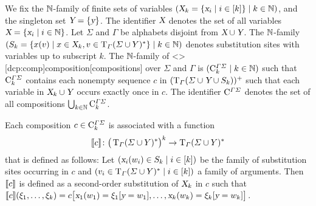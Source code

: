 \documentclass[../../document.tex]{subfiles}
\begin{document}
    \begin{definition}[Composition]
        We fix the \(\mathbb{N}\)-family of finite sets of variables \((\textsl{X}_k = \{\textsl{x}_i \mid i \in [k]\} \mid k \in \mathbb{N})\), and the singleton set \(\textsl{Y} = \{\textsl{y}\}\).
        The identifier \(\textsl{X}\) denotes the set of all variables \(\textsl{X} = \{\textsl{x}_i \mid i \in \mathbb{N}\}\).
        Let \(\varSigma\) and \(\varGamma\) be alphabets disjoint from \(\textsl{X} \cup \textsl{Y}\).
        The \(\mathbb{N}\)-family \((S_k = \{x(v) \mid x \in \textsl{X}_k, v \in \operatorname{T}_\varGamma(\varSigma \cup Y)^*\} \mid k \in \mathbb{N})\) denotes substitution sites with variables up to subscript \(k\).
        The \(\mathbb{N}\)-family of  <\dcp>[dcp:comp]{composition}[compositions] over \(\varSigma\) and \(\varGamma\) is \((\mathrm{C}^{\varGamma\varSigma}_k \mid k \in \mathbb{N})\) such that \(\mathrm{C}^{\varGamma\varSigma}_k\) contains each nonempty sequence \(c\) in \((\operatorname{T}_\varGamma(\varSigma \cup \textsl{Y} \cup S_k))^+\) such that each variable in \(\textsl{X}_k \cup \textsl{Y}\) occurs exactly once in \(c\).
        The identifier \(\mathrm{C}^{\varGamma\varSigma}\) denotes the set of all  compositions \(\bigcup_{k \in \mathbb{N}} \mathrm{C}^{\varGamma\varSigma}_{k}\).

        Each composition \(c \in \mathrm{C}^{\varGamma\varSigma}_k\) is associated with a function \[
            \llbracket c\rrbracket\colon \big(\operatorname{T}_\varGamma(\varSigma \cup Y)^*\big)^k \to \operatorname{T}_\varGamma(\varSigma \cup Y)^*
        \] that is defined as follows:
            Let \((\textsl{x}_i(w_i) \in S_k \mid i \in [k])\) be the family of substitution sites occurring in \(c\) and \((v_i \in \operatorname{T}_\varGamma(\varSigma \cup Y)^* \mid i \in [k])\) a family of arguments.
            Then \(\llbracket c\rrbracket\) is defined as a second-order substitution of \(\textsl{X}_k\) in \(c\) such that \(\llbracket c\rrbracket(\xi_1, \ldots, \xi_k) = c\big[\textsl{x}_1(w_1)=\xi_1[\textsl{y}=w_1], \ldots, \textsl{x}_k(w_k)=\xi_k[\textsl{y}=w_k]\big]\).
    \end{definition}

\end{document}
